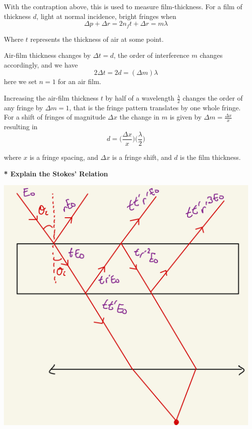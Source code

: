\documentclass[10pt]{article}
\newcommand*{\lo}[1]{
    \textbf{* #1} \newline
}
\begin{document}
With the contraption above, this is used to measure film-thickness. For a film of thickness $d$, light at normal incidence, bright fringes when
\[\Delta p + \Delta r = 2n_ft + \Delta r = m \lambda\] 

Where $t$ represents the thickness of air at some point. 

\newpage

Air-film thickness changes by $\Delta t = d$, the order of interference $m$ changes accordingly, and we have 
\[2\Delta t = 2d = (\Delta m)\lambda\] here we set $n =1$ for an air film.

\newblock

Increasing the air-film thickness $t$ by half of a wavelength $\frac{\lambda}{2}$ changes the order of any fringe by $\Delta m = 1$, that is the fringe pattern translates by one whole fringe. For a shift of fringes of magnitude $\Delta x$ the change in $m$ is given by $\Delta m = \frac{\Delta x}{x}$ resulting in 
\[d = \bigg(\frac{\Delta x}{x}\bigg) \bigg(\frac{\lambda}{2}\bigg)\]

where $x$ is a fringe spacing, and $\Delta x$ is a fringe shift, and $d$ is the film thickness.

\lo{Explain the Stokes' Relation}

\begin{center}
    \includegraphics*[scale = .2]{imgs/stokes-relation.jpeg}
\end{center}
\end{document}
